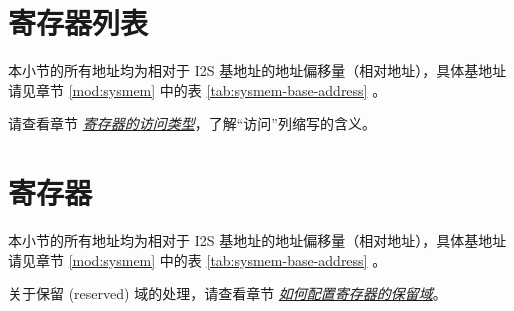 \documentclass[main\_\_CN.tex]{subfiles}
\begin{document}


\newpage
\hypertarget{i2s-reg-summ}{}
\section{寄存器列表}
\label{sec:i2s-reg-summ}


本小节的所有地址均为相对于 I2S 基地址的地址偏移量（相对地址），具体基地址请见章节 \ref{mod:sysmem} \textit{} 中的表 \ref{tab:sysmem-base-address} \textit{}。

请查看章节 \hyperref[glossary-access-types]{\textit{寄存器的访问类型}}，了解“访问”列缩写的含义。






\newpage
\section{寄存器}

本小节的所有地址均为相对于 I2S 基地址的地址偏移量（相对地址），具体基地址请见章节 \ref{mod:sysmem} \textit{} 中的表 \ref{tab:sysmem-base-address} \textit{}。

关于保留 (reserved) 域的处理，请查看章节 \hyperref[programming-reserved-field]{\textit{如何配置寄存器的保留域}}。


\end{document}
